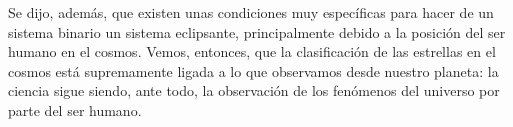 \documentclass[10pt,twocolumn]{article}
\begin{document}
Se dijo, además, que existen unas condiciones muy específicas para hacer de un sistema binario un sistema eclipsante, principalmente
debido a la posición del ser humano en el cosmos. Vemos, entonces, que la clasificación de las estrellas en el cosmos está supremamente
ligada a lo que observamos desde nuestro planeta: la ciencia sigue siendo, ante todo, la observación de los fenómenos del universo por parte 
del ser humano.



\end{document}
